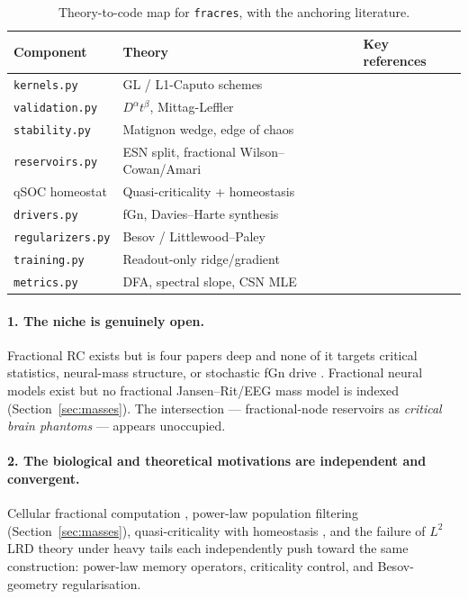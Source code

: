 \documentclass[11pt,a4paper]{article}
\begin{document}
\begin{table}[t]
\centering\small
\caption{Theory-to-code map for \texttt{fracres}, with the anchoring literature.}
\label{tab:map}
\begin{tabular}{@{}lll@{}}
\toprule
Component & Theory & Key references \\
\midrule
\texttt{kernels.py} & GL / L1-Caputo schemes & \cite{oldham1974fractional,linxu2007l1,scherer2011grunwald} \\
\texttt{validation.py} & $D^\alpha t^\beta$, Mittag-Leffler & \cite{podlubny1999fractional,gorenflo2014mittag} \\
\texttt{stability.py} & Matignon wedge, edge of chaos & \cite{matignon1996stability,bertschinger2004edge} \\
\texttt{reservoirs.py} & ESN split, fractional Wilson--Cowan/Amari & \cite{jaeger2001echo,wilson1972excitatory,amari1977dynamics} \\
qSOC homeostat & Quasi-criticality + homeostasis & \cite{bonachela2009self,turrigiano2004homeostatic} \\
\texttt{drivers.py} & fGn, Davies--Harte synthesis & \cite{mandelbrot1968fractional,davies1987tests} \\
\texttt{regularizers.py} & Besov / Littlewood--Paley & \cite{abry2003self,samorodnitsky2007long} \\
\texttt{training.py} & Readout-only ridge/gradient & \cite{jaeger2001echo,verstraeten2007unification} \\
\texttt{metrics.py} & DFA, spectral slope, CSN MLE & \cite{peng1994mosaic,clauset2009power} \\
\bottomrule
\end{tabular}
\end{table}

\paragraph{1. The niche is genuinely open.}
Fractional RC exists but is four papers deep and none of it targets critical
statistics, neural-mass structure, or stochastic fGn drive
\cite{yao2020fractional,goswami2026longmemory,mastin2026fractional,teuscher2026hardware}.
Fractional neural models exist but no fractional Jansen--Rit/EEG mass model
is indexed (Section~\ref{sec:masses}). The intersection --- fractional-node
reservoirs as \emph{critical brain phantoms} --- appears unoccupied.

\paragraph{2. The biological and theoretical motivations are independent and
convergent.}
Cellular fractional computation \cite{lundstrom2008fractional,anastasio1994fractional},
power-law population filtering (Section~\ref{sec:masses}), quasi-criticality
with homeostasis \cite{bonachela2009self,turrigiano2004homeostatic}, and the
failure of $L^2$ LRD theory under heavy tails
\cite{samorodnitsky2007long} each independently push toward the same
construction: power-law memory operators, criticality control, and
Besov-geometry regularisation.
\end{document}
